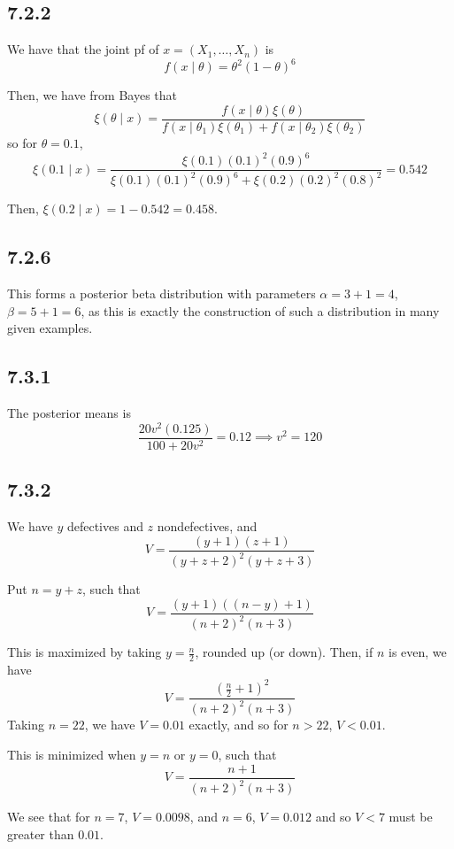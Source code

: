 \documentclass[12pt,letterpaper]{article}
\theoremstyle{definition}
\begin{document}
\subsection*{7.2.2}
 
We have that the joint pf of $x = (X_1, \dots, X_n)$ is
\[
  f(x \mid \theta) = \theta^2(1-\theta)^6
\]

Then, we have from Bayes that
\[
  \xi(\theta \mid x) = \frac{f(x\mid \theta)\xi(\theta)}{f(x\mid
    \theta_1)\xi(\theta_1) + f(x\mid \theta_2)\xi(\theta_2)}
\]
so for $\theta = 0.1$,
\[
  \xi(0.1 \mid x) = \frac{\xi(0.1)(0.1)^2(0.9)^6}{\xi(0.1)(0.1)^2(0.9)^6 +
    \xi(0.2)(0.2)^2(0.8)^2} = 0.542
\]

Then, $\xi(0.2 \mid x) = 1 - 0.542 = 0.458$.

\subsection*{7.2.6}

This forms a posterior beta distribution with parameters $\alpha = 3 + 1 = 4$,
$\beta = 5 + 1 = 6$, as this is exactly the construction of such a distribution
in many given examples.

\subsection*{7.3.1}

The posterior means is
\[
  \frac{20v^2(0.125)}{100 + 20v^2} = 0.12 \implies v^2 = 120
\]

\subsection*{7.3.2}

We have $y$ defectives and $z$ nondefectives, and
\[
  V = \frac{(y+1)(z+1)}{(y+z+2)^2(y+z+3)}
\]

Put $n = y + z$, such that
\[
  V = \frac{(y+1)((n-y)+1)}{(n+2)^2(n+3)}
\]

This is maximized by taking $y = \frac{n}{2}$, rounded up (or down). Then, if
$n$ is even, we have
\[
  V = \frac{(\frac{n}{2} + 1)^2}{(n+2)^2(n+3)}
\]
Taking $n = 22$, we have $V = 0.01$ exactly, and so for $n > 22$, $V < 0.01$.

This is minimized when $y = n$ or $y = 0$, such that
\[
  V = \frac{n+1}{(n+2)^2(n+3)}
\]

We see that for $n = 7$, $V = 0.0098$, and $n = 6$, $V = 0.012$  and so $V < 7$
must be greater than $0.01$.
\end{document}
